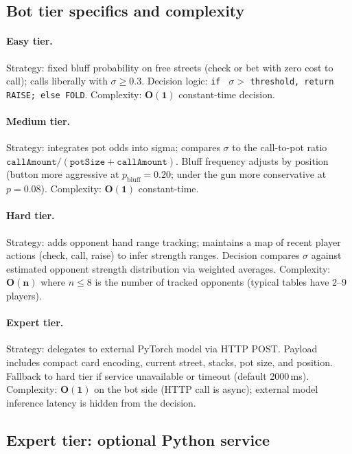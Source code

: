 \documentclass[11pt,a4paper]{article}
\begin{document}
\subsection{Bot tier specifics and complexity}

\paragraph{Easy tier.}
Strategy: fixed bluff probability on free streets (check or bet with zero cost to call); calls liberally with $\sigma \ge 0.3$. Decision logic: \texttt{if } $\sigma >$ \texttt{threshold, return RAISE; else FOLD}. Complexity: $\mathbf{O(1)}$ constant-time decision.

\paragraph{Medium tier.}
Strategy: integrates pot odds into sigma; compares $\sigma$ to the call-to-pot ratio $\texttt{callAmount} / (\texttt{potSize} + \texttt{callAmount})$. Bluff frequency adjusts by position (button more aggressive at $p_{\text{bluff}} = 0.20$; under the gun more conservative at $p = 0.08$). Complexity: $\mathbf{O(1)}$ constant-time.

\paragraph{Hard tier.}
Strategy: adds opponent hand range tracking; maintains a map of recent player actions (check, call, raise) to infer strength ranges. Decision compares $\sigma$ against estimated opponent strength distribution via weighted averages. Complexity: $\mathbf{O(n)}$ where $n \le 8$ is the number of tracked opponents (typical tables have 2--9 players).

\paragraph{Expert tier.}
Strategy: delegates to external PyTorch model via HTTP POST. Payload includes compact card encoding, current street, stacks, pot size, and position. Fallback to hard tier if service unavailable or timeout (default 2000\,ms). Complexity: $\mathbf{O(1)}$ on the bot side (HTTP call is async); external model inference latency is hidden from the decision.

\subsection{Expert tier: optional Python service}
\end{document}
